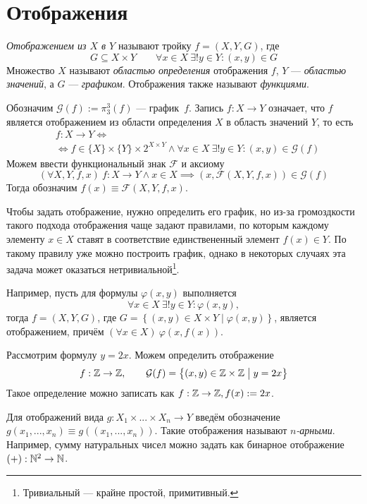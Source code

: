 \section{Отображения}

\newcommand\G{\mathcal G}
{\it Отображением из $X$ в $Y$} называют тройку $f=(X,Y,G)$, где
\[
  G\subseteq X\times Y\qquad
  \forall x\in X~\exists! y\in Y:(x,y)\in G
\]
Множество $X$ называют {\it областью определения} отображения $f$,
$Y$ --- {\it областью значений}, а $G$ --- {\it графиком}.
Отображения также называют {\it функциями}.

Обозначим $\G(f):=\pi_{3}^{3}(f)$ --- график~$f$.
Запись ${f:X\to Y}$ означает, что $f$ является отображением из
области определения $X$ в область значений $Y$, то есть
\[
  \begin{aligned}
     & f:X\to Y\iff \\
     & \iff
    f\in \{X\}\times \{Y\}\times 2^{X\times Y}\land
    \forall x\in X~\exists !y\in Y:(x,y)\in \G(f)
  \end{aligned}
\]
Можем ввести функциональный знак $\mathcal F$ и аксиому
\[
  (\forall X,Y,f,x)~f:X\to Y\land x\in X\implies
  (x,\mathcal F(X,Y,f,x))\in \G(f)
\]
Тогда обозначим $f(x)\equiv \mathcal F(X,Y,f,x)$.

Чтобы задать отображение, нужно определить его график, но
из-за громоздкости такого подхода отображения чаще задают правилами,
по которым каждому элементу $x\in X$
ставят в соответствие единствененный элемент $f(x)\in Y$.
По такому правилу уже можно
построить график, однако в некоторых случаях
эта задача может оказаться нетривиальной\footnote{
  Тривиальный --- крайне простой, примитивный.}.

Например, пусть для формулы $\varphi(x,y)$ выполняется
\[
  \forall x\in X~\exists !y\in Y:\varphi(x,y),
\]
тогда $f=(X,Y,G)$, где
$G=\left\{(x,y)\in X\times Y\;\big|\; \varphi(x,y)\right\}$,
является отображением, причём $(\forall x\in X)~\varphi(x,f(x))$.

Рассмотрим формулу ${y=2x}$. Можем определить отображение
\[
  f:\Z\to\Z,\qquad
  \G(f)=\left\{(x,y)\in \Z\times \Z\;\big|\; y=2x\right\}
\]
Такое определение можно записать как $f:\mathbb Z\to\mathbb Z,f(x):=2x$.

Для отображений вида ${g:X_1\times ...\times X_{n}\to Y}$
введём обозначение $g(x_1,...,x_{n})\equiv g((x_1,...,x_{n}))$.
Такие отображения называют {\it \mbox{$n$-арными}}.
Например, сумму натуральных чисел можно
задать как бинарное отображение $(+):\mathbb N^{2}\to\mathbb N$.

